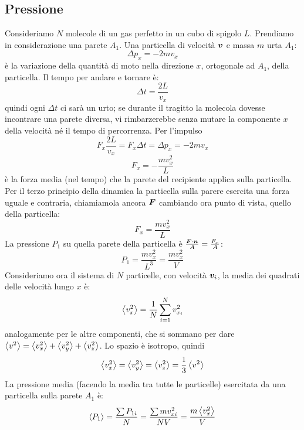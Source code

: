 \subsection{Pressione}
Consideriamo $N$ molecole di un gas perfetto in un cubo di spigolo $L$. Prendiamo in considerazione una parete $A_1$. Una particella di velocità $\boldsymbol{v}$ e massa $m$ urta $A_1$:
\begin{equation}
   \Delta p_x=-2mv_x
\end{equation}
è la variazione della quantità di moto nella direzione $x$, ortogonale ad $A_1$, della particella. Il tempo per andare e tornare è:
\begin{equation}
   \Delta t=\frac{2L}{v_x}
\end{equation}
quindi ogni $\Delta t$ ci sarà un urto; se durante il tragitto la molecola dovesse incontrare una parete diversa, vi rimbarzerebbe senza mutare la componente $x$ della velocità né il tempo di percorrenza. Per l'impulso
\[
   F_x\frac{2L}{v_x}=F_x\Delta t=\Delta p_x=-2mv_x
\]
\begin{equation}
   F_x=-\frac{mv_x^2}{L}
\end{equation}
è la forza media (nel tempo) che la parete del recipiente applica sulla particella. Per il terzo principio della dinamica la particella sulla parere esercita una forza uguale e contraria, chiamiamola ancora $\boldsymbol{F}$ cambiando ora punto di vista, quello della particella:
\begin{equation}
   F_x=\frac{mv_x^2}{L}
\end{equation}
La pressione $P_1$ su quella parete della particella è $\frac{\boldsymbol{F}\cdot \boldsymbol{n}}{A}=\frac{F_x}{A}$:
\begin{equation}
   P_1=\frac{mv_x^2}{L^3}=\frac{mv_x^2}{V}
\end{equation}
Consideriamo ora il sistema di $N$ particelle, con velocità $\boldsymbol{v}_i$, la media dei quadrati delle velocità lungo $x$ è:
\begin{equation}
   \left<v_x^2\right>=\frac{1}{N}\sum_{i=1}^{N}{v_{x_i}^2}
\end{equation}
analogamente per le altre componenti, che si sommano per dare $\left<v^2\right>=\left<v_x^2\right>+\left<v_y^2\right>+\left<v_z^2\right>$. Lo spazio è isotropo, quindi
\begin{equation}
   \left<v_x^2\right>=\left<v_y^2\right>=\left<v_z^2\right>=\frac{1}{3}\left<v^2\right>
\end{equation}
La pressione media (facendo la media tra tutte le particelle) esercitata da una particella sulla parete $A_1$ è:
\[\left<P_{1}\right> = \frac{\sum P_{1i}}{N}=\frac{\sum m v_{xi}^2}{NV}=\frac{m\left<v_x^2\right>}{V}\]
